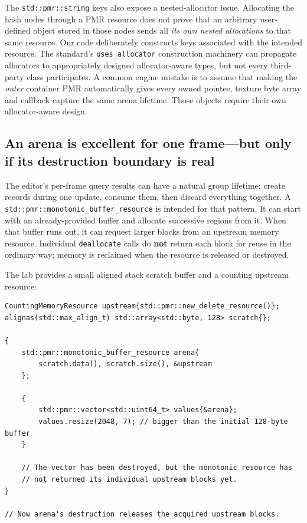 The \texttt{std::pmr::string} keys also expose a nested-allocator issue. Allocating the hash nodes through a PMR resource does not prove that an arbitrary user-defined object stored in those nodes sends all \emph{its own nested allocations} to that same resource. Our code deliberately constructs keys associated with the intended resource. The standard's \texttt{uses\_allocator} construction machinery can propagate allocators to appropriately designed allocator-aware types, but not every third-party class participates. A common engine mistake is to assume that making the \emph{outer} container PMR automatically gives every owned pointee, texture byte array and callback capture the same arena lifetime. Those objects require their own allocator-aware design.

\subsection{An arena is excellent for one frame---but only if its destruction boundary is real}\label{01-foundations-i-ch006-an-arena-is-excellent-for-one-framebut-only-if-its-destruction-boundary-is-real}

The editor's per-frame query results can have a natural group lifetime: create records during one update, consume them, then discard everything together. A \texttt{std::pmr::monotonic\_buffer\_resource} is intended for that pattern. It can start with an already-provided buffer and allocate successive regions from it. When that buffer runs out, it can request larger blocks from an upstream memory resource. Individual \texttt{deallocate} calls do \textbf{not} return each block for reuse in the ordinary way; memory is reclaimed when the resource is released or destroyed.

The lab provides a small aligned stack scratch buffer and a counting upstream resource:

\begin{verbatim}
CountingMemoryResource upstream{std::pmr::new_delete_resource()};
alignas(std::max_align_t) std::array<std::byte, 128> scratch{};

{
    std::pmr::monotonic_buffer_resource arena{
        scratch.data(), scratch.size(), &upstream
    };

    {
        std::pmr::vector<std::uint64_t> values{&arena};
        values.resize(2048, 7); // bigger than the initial 128-byte buffer
    }

    // The vector has been destroyed, but the monotonic resource has
    // not returned its individual upstream blocks yet.
}

// Now arena's destruction releases the acquired upstream blocks.
\end{verbatim}

